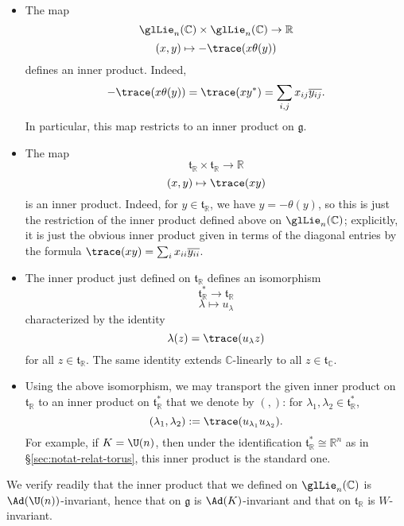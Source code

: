 \documentclass[reqno]{amsart} 
\begin{document}
\begin{itemize}
\item The map
  \begin{equation*}
    \glLie_n(\mathbb{C}) \times \glLie_n(\mathbb{C}) \rightarrow \mathbb{R}
  \end{equation*}
  \begin{equation*}
    (x,y) \mapsto - \trace(x \theta(y))
  \end{equation*}
  defines an inner product.  Indeed,
  \begin{equation*}
    - \trace(x \theta(y)) = \trace(x y^*) = \sum_{i,j} x_{i j} \overline{y_{i j}}.
  \end{equation*}
  In particular, this map restricts to an inner product on $\mathfrak{g}$.
\item The map
  \begin{equation*}
    \mathfrak{t}_{\mathbb{R}} \times \mathfrak{t}_{\mathbb{R}} \rightarrow \mathbb{R}
  \end{equation*}
  \begin{equation*}
    (x,y) \mapsto \trace( x y)
  \end{equation*}
  is an inner product.  Indeed, for $y \in \mathfrak{t}_{\mathbb{R}}$, we have $y = - \theta(y)$, so this is just the restriction of the inner product defined above on $\glLie_n(\mathbb{C})$; explicitly, it is just the obvious inner product given in terms of the diagonal entries by the formula $\trace(x y) = \sum_{i} x_{i i} \overline{y_{i i}}$.
\item The inner product just defined on $\mathfrak{t}_{\mathbb{R}}$ defines an isomorphism
  \begin{equation*}
    \mathfrak{t}_{\mathbb{R}}^* \rightarrow \mathfrak{t}_{\mathbb{R}}
  \end{equation*}
  \begin{equation*}
    \lambda \mapsto u_\lambda
  \end{equation*}
  characterized by the identity
  \begin{equation}\label{eq:characterize-u-lambda}
    \lambda(z) = \trace(u_\lambda z)
  \end{equation}
  for all $z \in \mathfrak{t}_{\mathbb{R}}$.  The same identity extends $\mathbb{C}$-linearly to all $z \in \mathfrak{t}_{\mathbb{C}}$.
\item Using the above isomorphism, we may transport the given inner product on $\mathfrak{t}_{\mathbb{R}}$ to an inner product on $\mathfrak{t}_{\mathbb{R}}^*$ that we denote by $(,)$: for $\lambda_1, \lambda_2 \in \mathfrak{t}_{\mathbb{R}}^*$,
  \begin{equation}\label{eq:}
    (\lambda_1, \lambda_2) := \trace(u_{\lambda_1} u_{\lambda_2}).
  \end{equation}
  For example, if $K = \U(n)$, then under the identification $\mathfrak{t}_{\mathbb{R}}^* \cong \mathbb{R}^n$ as in \S\ref{sec:notat-relat-torus}, this inner product is the standard one.
\end{itemize}
We verify readily that the inner product that we defined on $\glLie_n(\mathbb{C})$ is $\Ad(\U(n))$-invariant, hence that on $\mathfrak{g}$ is $\Ad(K)$-invariant and that on $\mathfrak{t}_{\mathbb{R}}$ is $W$-invariant.
\end{document}

